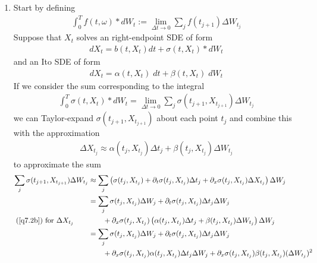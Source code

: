 \documentclass[12pt]{article}
\theoremstyle{plain}
\theoremstyle{definition}
\theoremstyle{remark}
\begin{document}
\begin{enumerate}
  \item %
    Start by defining
    \begin{align*}
      \int^T_0 f(t,\omega) * dW_t := \lim_{\Delta t\rightarrow 0}
        \sum_j f(t_{j+1}) \Delta W_{t_j}
    \end{align*}
    Suppose that $X_t$ solves an right-endpoint SDE of form
    \begin{align}
      \label{q7.0}
      dX_t = b(t,X_t) dt + \sigma(t,X_t) * dW_t
    \end{align}
    and an Ito SDE of form
    \begin{align}
      \label{q7.1}
      dX_t = \alpha(t,X_t)\; dt + \beta(t,X_t)\; dW_t
    \end{align}
    If we consider the sum corresponding to the integral
    \begin{align*}
      \int^T_0 \sigma(t,X_t) * dW_t
      =
      \lim_{\Delta t\rightarrow 0}
      \sum_j \sigma(t_{j+1},X_{t_{j+1}}) \Delta W_{t_j}
    \end{align*}
    we can Taylor-expand $\sigma(t_{j+1},X_{t_{j+1}})$ about each point
    $t_j$ and combine this with the approximation
    \begin{align}
      \Delta X_{t_{j}} \approx \alpha(t_j,X_{t_j})
      \Delta t_j + \beta(t_j , X_{t_j}) \Delta W_{t_j}
      \label{q7.2b}
    \end{align}
    to approximate the sum
    \begin{align*}
      \sum_j \sigma(t_{j+1},X_{t_{j+1}}) \Delta W_{t_j}
      &\approx
      \sum_j
      \left(
        \sigma(t_j,X_{t_j}) + \partial_t \sigma(t_j,X_{t_j}) \Delta t_j
        + \partial_x \sigma(t_j,X_{t_j})\Delta X_{t_j}
      \right)\Delta W_j\\
      &=
      \sum_j
      \sigma(t_j,X_{t_j})\Delta W_j
        + \partial_t \sigma(t_j,X_{t_j}) \Delta t_j\Delta W_j\\
      \text{(\ref{q7.2b}) for $\Delta X_{t_j}$} \qquad
      &\qquad + \partial_x \sigma(t_j,X_{t_j})\left(
        \alpha(t_j,X_{t_j})
          \Delta t_j + \beta(t_j, X_{t_j}) \Delta W_{t_j}
      \right)\Delta W_j\\
      &=
      \sum_j
      \sigma(t_j,X_{t_j})\Delta W_j
        + \partial_t \sigma(t_j,X_{t_j}) \Delta t_j\Delta W_j\\
      &\qquad + \partial_x \sigma(t_j,X_{t_j})
        \alpha(t_j,X_{t_j}) \Delta t_j \Delta W_j
      + \partial_x \sigma(t_j,X_{t_j})\beta(t_j , X_{t_j}) (\Delta W_{t_j})^2
    \end{align*}

\end{enumerate}
\end{document}
